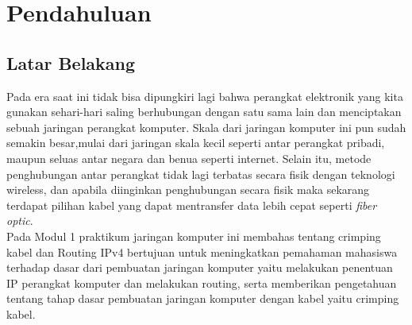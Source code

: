 \section{Pendahuluan}
\subsection{Latar Belakang}
Pada era saat ini tidak bisa dipungkiri lagi bahwa perangkat elektronik yang kita gunakan sehari-hari saling berhubungan dengan satu sama lain dan menciptakan sebuah jaringan perangkat komputer. Skala dari jaringan komputer ini pun sudah semakin besar,mulai dari jaringan skala kecil seperti antar perangkat pribadi, maupun seluas antar negara dan benua seperti internet. Selain itu, metode penghubungan antar perangkat tidak lagi terbatas secara fisik dengan teknologi wireless, dan apabila diinginkan penghubungan secara fisik maka sekarang terdapat pilihan kabel yang dapat mentransfer data lebih cepat seperti \textit{fiber optic}.\\
Pada Modul 1 praktikum jaringan komputer ini membahas tentang crimping kabel dan Routing IPv4 bertujuan untuk meningkatkan pemahaman mahasiswa terhadap dasar dari pembuatan jaringan komputer yaitu melakukan penentuan IP perangkat komputer dan melakukan routing, serta memberikan pengetahuan tentang tahap dasar pembuatan jaringan komputer dengan kabel yaitu crimping kabel. 
